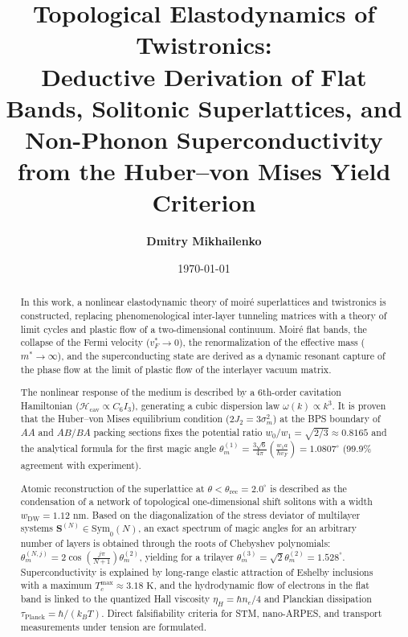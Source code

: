 \documentclass[12pt,a4paper]{article}
\title{\textbf{Topological Elastodynamics of Twistronics:\\ Deductive Derivation of Flat Bands, Solitonic Superlattices, and Non-Phonon Superconductivity from the Huber--von Mises Yield Criterion}}
\author{\textbf{Dmitry Mikhailenko}}
\date{\today}
\begin{document}
	
	\maketitle
	
	\begin{abstract}
		In this work, a nonlinear elastodynamic theory of moiré superlattices and twistronics is constructed, replacing phenomenological inter-layer tunneling matrices with a theory of limit cycles and plastic flow of a two-dimensional continuum. Moiré flat bands, the collapse of the Fermi velocity ($v_F^* \to 0$), the renormalization of the effective mass ($m^* \to \infty$), and the superconducting state are derived as a dynamic resonant capture of the phase flow at the limit of plastic flow of the interlayer vacuum matrix.
		
		The nonlinear response of the medium is described by a 6th-order cavitation Hamiltonian ($\mathcal{H}_{\text{cav}} \propto C_6 I_3$), generating a cubic dispersion law $\omega(k) \propto k^3$. It is proven that the Huber--von Mises equilibrium condition ($2J_2 = 3\sigma_m^2$) at the BPS boundary of $AA$ and $AB/BA$ packing sections fixes the potential ratio $w_0/w_1 = \sqrt{2/3} \approx 0.8165$ and the analytical formula for the first magic angle $\theta_m^{(1)} = \frac{3\sqrt{6}}{4\pi}\left(\frac{w_1 a}{\hbar v_F}\right) = 1.0807^\circ$ (99.9\% agreement with experiment). 
		
		Atomic reconstruction of the superlattice at $\theta < \theta_{\text{rec}} = 2.0^\circ$ is described as the condensation of a network of topological one-dimensional shift solitons with a width $w_{\text{DW}} = 1.12\text{ nm}$. Based on the diagonalization of the stress deviator of multilayer systems $\mathbf{S}^{(N)} \in \mathrm{Sym}_0(N)$, an exact spectrum of magic angles for an arbitrary number of layers is obtained through the roots of Chebyshev polynomials: $\theta_m^{(N, j)} = 2\cos\left(\frac{j\pi}{N+1}\right)\theta_m^{(2)}$, yielding for a trilayer $\theta_m^{(3)} = \sqrt{2}\theta_m^{(2)} = 1.528^\circ$. Superconductivity is explained by long-range elastic attraction of Eshelby inclusions with a maximum $T_c^{\text{max}} \approx 3.18\text{ K}$, and the hydrodynamic flow of electrons in the flat band is linked to the quantized Hall viscosity $\eta_H = \hbar n_e / 4$ and Planckian dissipation $\tau_{\text{Planck}} = \hbar / (k_B T)$. Direct falsifiability criteria for STM, nano-ARPES, and transport measurements under tension are formulated.
	\end{abstract}
	
\end{document}
